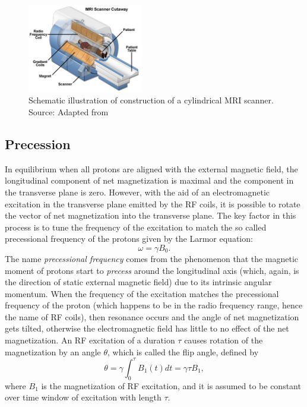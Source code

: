 \begin{figure}
    \centering
    \includegraphics[width=0.45\textwidth]{images/mri-scanner.jpg}
    \caption{Schematic illustration of construction of a cylindrical MRI scanner.\\
    Source: Adapted from~\cite{coyne_mri_2020}}
    \label{fig:mri_schematic}
\end{figure}

\subsection{Precession}
In equilibrium when all protons are aligned with the external magnetic field, the longitudinal component of net magnetization is maximal and the component in the transverse plane is zero. However, with the aid of an electromagnetic excitation in the transverse plane emitted by the RF coils, it is possible to rotate the vector of net magnetization into the transverse plane. The key factor in this process is to tune the frequency of the excitation to match the so called precessional frequency of the protons given by the Larmor equation:
\[\omega = \gamma B_0.\]
The name \textit{precessional frequency} comes from the phenomenon that the magnetic moment of protons start to \textit{precess} around the longitudinal axis (which, again, is the direction of static external magnetic field) due to its intrinsic angular momentum. When the frequency of the excitation matches the precessional frequency of the proton (which happens to be in the radio frequency range, hence the name of RF coils), then resonance occurs and the angle of net magnetization gets tilted, otherwise the electromagnetic field has little to no effect of the net magnetization. An RF excitation of a duration $\tau$ causes rotation of the magnetization by an angle $\theta$, which is called the flip angle, defined by
\[\theta = \gamma \int_0^\tau B_1(t) dt = \gamma \tau B_1,\]
where $B_1$ is the magnetization of RF excitation, and it is assumed to be constant over time window of excitation with length $\tau$.

